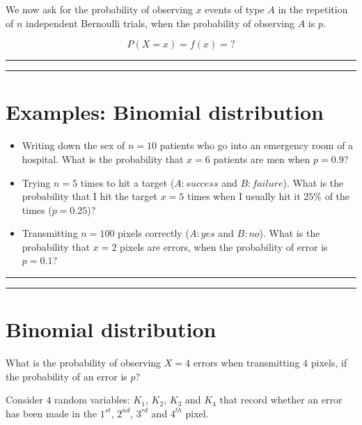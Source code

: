 \documentclass[
]{book}
\begin{document}
We now ask for the probability of observing \(x\) events of type \(A\) in the repetition of \(n\) independent Bernoulli trials, when the probability of observing \(A\) is \(p\).

\[P(X=x)=f(x)=?\]

\begin{center}\rule{0.5\linewidth}{0.5pt}\end{center}

\begin{center}\rule{0.5\linewidth}{0.5pt}\end{center}

\hypertarget{examples-binomial-distribution}{%
\section{Examples: Binomial distribution}\label{examples-binomial-distribution}}

\begin{itemize}
\item
  Writing down the sex of \(n=10\) patients who go into an emergency room of a hospital. What is the probability that \(x=6\) patients are men when \(p=0.9\)?
\item
  Trying \(n=5\) times to hit a target (\(A:success\) and \(B:failure\)). What is the probability that I hit the target \(x=5\) times when I usually hit it \(25\%\) of the times (\(p=0.25\))?
\item
  Transmitting \(n=100\) pixels correctly (\(A:yes\) and \(B:no\)). What is the probability that \(x=2\) pixels are errors, when the probability of error is \(p=0.1\)?
\end{itemize}

\begin{center}\rule{0.5\linewidth}{0.5pt}\end{center}

\begin{center}\rule{0.5\linewidth}{0.5pt}\end{center}

\hypertarget{binomial-distribution-1}{%
\section{Binomial distribution}\label{binomial-distribution-1}}

What is the probability of observing \(X=4\) errors when transmitting \(4\) pixels, if the probability of an error is \(p\)?

Consider \(4\) random variables: \(K_1\), \(K_2\), \(K_3\) and \(K_4\) that record whether an error has been made in the \(1^{st}\), \(2^{nd}\), \(3^{rd}\) and \(4^{th}\) pixel.
\end{document}
